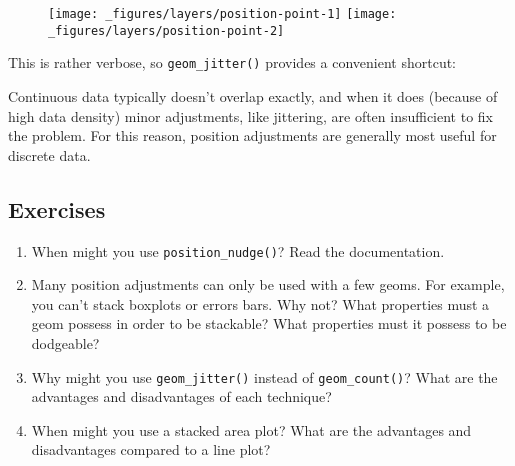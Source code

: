 \begin{Shaded}
\begin{Highlighting}[]
\StringTok{ }
\StringTok{  }\NormalTok{(} \NormalTok{)}
\StringTok{ }
\StringTok{  }\NormalTok{(} \NormalTok{(} \NormalTok{, } \NormalTok{))}
\end{Highlighting}
\end{Shaded}

\begin{figure}[H]
  \texttt{[image: \_figures/layers/position-point-1]}%
  \texttt{[image: \_figures/layers/position-point-2]}
\end{figure}

This is rather verbose, so \texttt{geom\_jitter()} provides a convenient
shortcut:

\begin{Shaded}
\begin{Highlighting}[]
\StringTok{ }
\StringTok{  }\NormalTok{(} \NormalTok{, } \NormalTok{)}
\end{Highlighting}
\end{Shaded}

Continuous data typically doesn't overlap exactly, and when it does
(because of high data density) minor adjustments, like jittering, are
often insufficient to fix the problem. For this reason, position
adjustments are generally most useful for discrete data.

\subsection{Exercises}

\begin{enumerate}
\def\labelenumi{\arabic{enumi}.}
\item
  When might you use \texttt{position\_nudge()}? Read the documentation.
\item
  Many position adjustments can only be used with a few geoms. For
  example, you can't stack boxplots or errors bars. Why not? What
  properties must a geom possess in order to be stackable? What
  properties must it possess to be dodgeable?
\item
  Why might you use \texttt{geom\_jitter()} instead of
  \texttt{geom\_count()}? What are the advantages and disadvantages of
  each technique?
\item
  When might you use a stacked area plot? What are the advantages and
  disadvantages compared to a line plot?
\end{enumerate}
